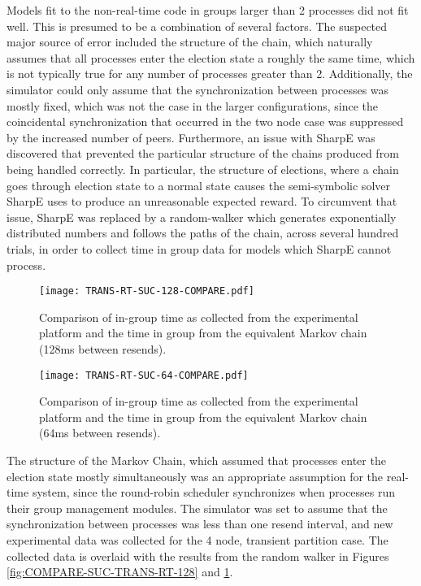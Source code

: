 Models fit to the non-real-time code in groups larger than 2 processes did not fit well.
This is presumed to be a combination of several factors. The suspected major source of error
included the structure of the chain, which naturally assumes that all processes enter the
election state a roughly the same time, which is not typically true for any number of processes
greater than 2. Additionally, the simulator could only assume that the synchronization between
processes was mostly fixed, which was not the case in the larger configurations, since the
coincidental synchronization that occurred in the two node case was suppressed by the increased
number of peers. Furthermore, an issue with SharpE was discovered that prevented the
particular structure of the chains produced from being handled correctly. In particular, the
structure of elections, where a chain goes through election state to a normal state causes the
semi-symbolic solver SharpE uses to produce an unreasonable expected reward. To circumvent that
issue, SharpE was replaced by a random-walker which generates exponentially distributed numbers
and follows the paths of the chain, across several hundred trials, in order to collect time in group data for
models which SharpE cannot process.

\begin{figure}
\centering
\begin{minipage}{0.45\textwidth}
    \centering
    \texttt{[image: TRANS-RT-SUC-128-COMPARE.pdf]}
    \caption{Comparison of in-group time as collected from the experimental platform and the time in group from the equivalent Markov chain (128ms between resends).}
    \label{fig:COMPARE-SUC-TRANS-RT-128}
\end{minipage}%
\qquad
\begin{minipage}{0.45\textwidth}
    \centering
    \texttt{[image: TRANS-RT-SUC-64-COMPARE.pdf]}
    \caption{Comparison of in-group time as collected from the experimental platform and the time in group from the equivalent Markov chain (64ms between resends).}
    \label{fig:COMPARE-SUC-TRANS-RT-64}
\end{minipage}
\end{figure}

The structure of the Markov Chain, which assumed that processes enter the election state
mostly simultaneously was an appropriate assumption for the real-time system, since the
round-robin scheduler synchronizes when processes run their group management modules. The
simulator was set to assume that the synchronization between processes was less than one resend interval, and
new experimental data was collected for the 4 node, transient partition case. The collected
data is overlaid with the results from the random walker in Figures \ref{fig:COMPARE-SUC-TRANS-RT-128} and \ref{fig:COMPARE-SUC-TRANS-RT-64}.

